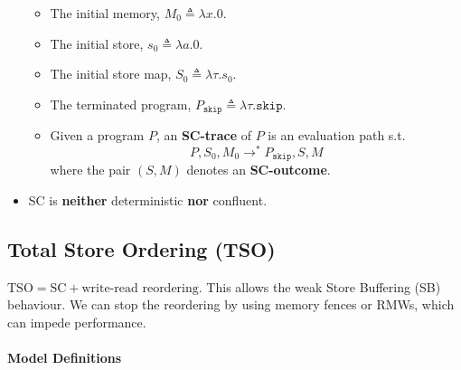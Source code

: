 \documentclass[twocolumn,landscape,10pt]{article}
\theoremstyle{definition}
\begin{document}
\begin{itemize}
        \begin{itemize}
            \item The initial memory, $M_0\triangleq\lambda x.0$.
            \item The initial store, $s_0\triangleq\lambda a.0$.
            \item The initial store map, $S_0\triangleq\lambda\tau.s_0$.
            \item The terminated program,
                $P_{\texttt{skip}}\triangleq\lambda\tau.\texttt{skip}$.
            \item Given a program $P$, an \textbf{SC-trace} of $P$ is an
                evaluation path s.t.
                \[
                    P,S_0,M_0\rightarrow^*P_{\texttt{skip}},S,M
                \]
                where the pair $(S,M)$ denotes an \textbf{SC-outcome}.
        \end{itemize} 
    \item SC is \textbf{neither} deterministic \textbf{nor} confluent.
\end{itemize} 

\subsection{Total Store Ordering (TSO)}

$\text{TSO}=\text{SC}+\text{write-read reordering}$. This allows the weak 
Store Buffering (SB) behaviour. We can stop the reordering by using memory
fences or RMWs, which can impede performance.

\paragraph{Model Definitions}
\end{document}
